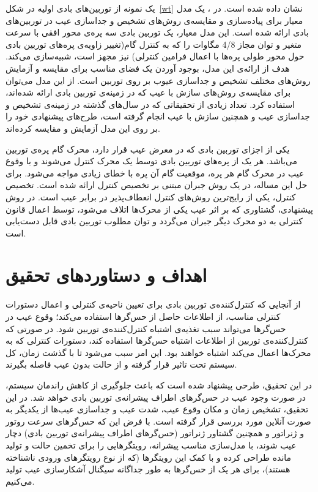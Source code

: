 یک نمونه از توربین‌های بادی اولیه در شکل~\ref{wt} نشان داده شده است. در \cite{a1} ، یک مدل معیار برای پیاده‌سازی و مقایسه‌ی روش‌های تشخیص و جداسازی عیب در توربین‌های بادی ارائه شده است. این مدل معیار، یک توربین بادی سه پره‌ی  محور افقی با سرعت متغیر و توان مجاز 4/8 مگا‌وات را که به کنترل گام(تغییر زاویه‌ی پره‌‌های توربین بادی حول محور طولی پره‌ها با اعمال فرامین کنترلی) نیز مجهز است، شبیه‌سازی می‌کند. هدف از ارائه‌ی این مدل، بوجود آوردن یک فضای مناسب برای مقایسه و آزمایش روش‌های مختلف تشخیص و جداسازی عیوب بر روی توربین است. از این مدل می‌توان برای مقایسه‌ی روش‌های سازش با عیب که در زمینه‌ی توربین بادی ارائه شده‌اند، استفاده کرد. تعداد زیادی از تحقیقاتی که در سال‌های گذشته در زمینه‌ی تشخیص و جداسازی عیب و همچنین سازش با عیب انجام گرفته است، طرح‌های پیشنهادی خود را بر روی این مدل آزمایش و مقایسه کرده‌اند. 

یکی از اجزای توربین بادی که در معرض عیب قرار دارد، محرک گام پره‌ی توربین می‌باشد. هر یک از پره‌های توربین بادی توسط یک محرک کنترل می‌شوند و با وقوع عیب در  محرک‌ گام هر پره، موقعیت گام آن پره با خطای زیادی مواجه می‌شود. برای حل این مساله،  در \cite{a10} یک روش جبران مبتنی بر تخصیص کنترل ارائه شده است. تخصیص کنترل، یکی از رایج‌ترین روش‌های کنترل انعطاف‌پذیر در برابر عیب است. در روش پیشنهادی، گشتاوری که بر اثر عیب یکی از محرک‌ها اتلاف می‌شود، توسط اعمال قانون کنترلی به دو محرک دیگر جبران می‌گردد و توان مطلوب توربین بادی قابل دست‌یابی است.



\section{اهداف و دستاوردهای تحقیق}
از آنجایی که کنترل‌کننده‌ی توربین بادی برای تعیین ناحیه‌ی کنترلی و اعمال دستورات کنترلی مناسب، از اطلاعات حاصل از حس‌گر‌ها استفاده می‌کند؛ وقوع عیب در حس‌گر‌ها می‌تواند سبب تغذیه‌ی اشتباه کنترل‌کننده‌ی توربین شود. در صورتی که کنترل‌کننده‌ی توربین از اطلاعات اشتباه حس‌گر‌ها استفاده کند، دستورات کنترلی که به محرک‌ها اعمال می‌کند اشتباه خواهند بود. این امر سبب می‌شود تا با گذشت زمان، کل سیستم تحت تاثیر قرار گرفته و از حالت بدون عیب فاصله بگیرند. 

در این تحقیق، طرحی پیشنهاد شده است که باعث جلوگیری از کاهش راندمان سیستم، در صورت وجود عیب در حس‌گر‌های اطراف پیشرانه‌ی توربین بادی خواهد شد. در این تحقیق، تشخیص زمان و مکان وقوع عیب، شدت عیب و جداسازی عیب‌ها از یکدیگر به صورت آنلاین مورد بررسی قرار گرفته است. با فرض این که حس‌گر‌های سرعت روتور و ژنراتور و همچنین گشتاور ژنراتور (حس‌گر‌های اطراف پیشرانه‌ی توربین بادی) دچار عیب شوند، با مدل‌سازی مناسب پیشرانه، رویتگر‌هایی را برای تخمین حالت و تولید مانده طراحی کرده و با کمک این رویتگر‌ها (که از نوع رویتگر‌های ورودی ناشناخته هستند)، برای هر یک از حس‌گر‌ها به طور جداگانه سیگنال آشکارسازی عیب تولید می‌کنیم. 


